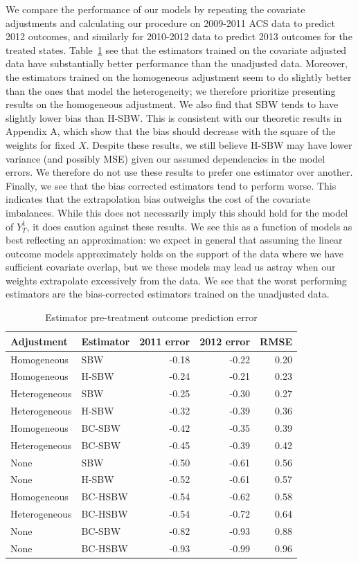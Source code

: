 We compare the performance of our models by repeating the covariate adjustments and calculating our procedure on 2009-2011 ACS data to predict 2012 outcomes, and similarly for 2010-2012 data to predict 2013 outcomes for the treated states. Table~\ref{tab:pretxpred} see that the estimators trained on the covariate adjusted data have substantially better performance than the unadjusted data. Moreover, the estimators trained on the homogeneous adjustment seem to do slightly better than the ones that model the heterogeneity; we therefore prioritize presenting results on the homogeneous adjustment. We also find that SBW tends to have slightly lower bias than H-SBW. This is consistent with our theoretic results in Appendix A, which show that the bias should decrease with the square of the weights for fixed $X$. Despite these results, we still believe H-SBW may have lower variance (and possibly MSE) given our assumed dependencies in the model errors. We therefore do not use these results to prefer one estimator over another. Finally, we see that the bias corrected estimators tend to perform worse. This indicates that the extrapolation bias outweighs the cost of the covariate imbalances. While this does not necessarily imply this should hold for the model of $Y^1_T$, it does caution against these results. We see this as a function of models as best reflecting an approximation: we expect in general that assuming the linear outcome models approximately holds on the support of the data where we have sufficient covariate overlap, but we these models may lead us astray when our weights extrapolate excessively from the data. We see that the worst performing estimators are the bias-corrected estimators trained on the unadjusted data.

\begin{table}[ht]
\caption{Estimator pre-treatment outcome prediction error}
\label{tab:pretxpred}
\begin{tabular}{llrrr}
  \hline
Adjustment & Estimator & 2011 error & 2012 error & RMSE \\ 
  \hline
Homogeneous & SBW & -0.18 & -0.22 & 0.20 \\ 
  Homogeneous & H-SBW & -0.24 & -0.21 & 0.23 \\ 
  Heterogeneous & SBW & -0.25 & -0.30 & 0.27 \\ 
  Heterogeneous & H-SBW & -0.32 & -0.39 & 0.36 \\ 
  Homogeneous & BC-SBW & -0.42 & -0.35 & 0.39 \\ 
  Heterogeneous & BC-SBW & -0.45 & -0.39 & 0.42 \\ 
  None & SBW & -0.50 & -0.61 & 0.56 \\ 
  None & H-SBW & -0.52 & -0.61 & 0.57 \\ 
  Homogeneous & BC-HSBW & -0.54 & -0.62 & 0.58 \\ 
  Heterogeneous & BC-HSBW & -0.54 & -0.72 & 0.64 \\ 
  None & BC-SBW & -0.82 & -0.93 & 0.88 \\ 
  None & BC-HSBW & -0.93 & -0.99 & 0.96 \\ 
   \hline
\end{tabular}
\end{table}

